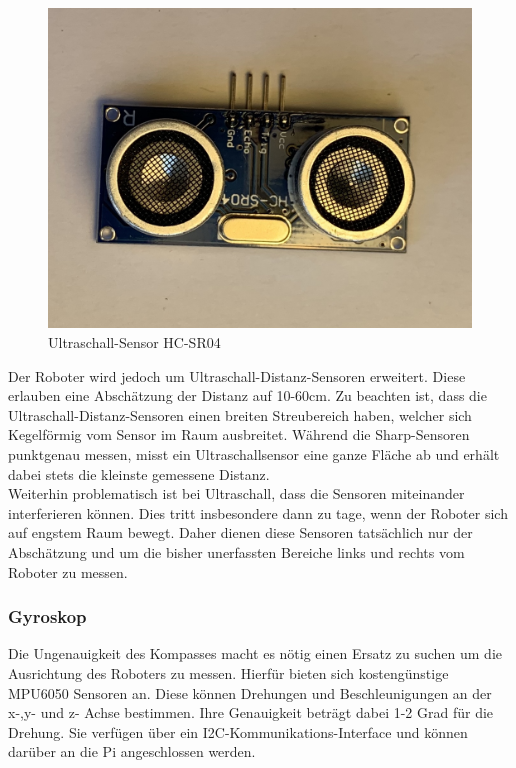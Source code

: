 \documentclass[twoside,12pt,a4paper]{report}
\begin{document}
	\begin{figure}[!htb]
		\centering
		\includegraphics[scale=0.1, angle=180]{images/ultraschall2.jpg}
		\caption{Ultraschall-Sensor HC-SR04}
	\end{figure}
	
	Der Roboter wird jedoch um Ultraschall-Distanz-Sensoren erweitert. Diese erlauben eine Abschätzung der Distanz auf 10-60cm. Zu beachten ist, dass die Ultraschall-Distanz-Sensoren einen breiten Streubereich haben, welcher sich Kegelförmig vom Sensor im Raum ausbreitet. Während die Sharp-Sensoren punktgenau messen, misst ein Ultraschallsensor eine ganze Fläche ab und erhält dabei stets die kleinste gemessene Distanz.\\
	Weiterhin problematisch ist bei Ultraschall, dass die Sensoren miteinander interferieren können. Dies tritt insbesondere dann zu tage, wenn der Roboter sich auf engstem Raum bewegt. Daher dienen diese Sensoren tatsächlich nur der Abschätzung und um die bisher unerfassten Bereiche links und rechts vom Roboter zu messen. 
	
	\subsubsection{Gyroskop}
	Die Ungenauigkeit des Kompasses macht es nötig einen Ersatz zu suchen um die Ausrichtung des Roboters zu messen. Hierfür bieten sich kostengünstige MPU6050 Sensoren an. Diese können Drehungen und Beschleunigungen an der x-,y- und z- Achse bestimmen. Ihre Genauigkeit beträgt dabei 1-2 Grad für die Drehung. Sie verfügen über ein I2C-Kommunikations-Interface und können darüber an die Pi angeschlossen werden. 
	
\end{document}
